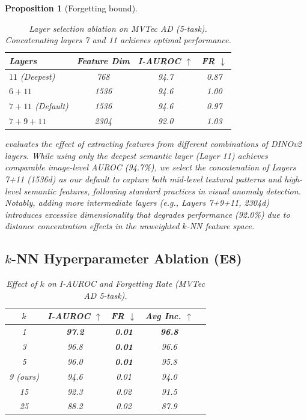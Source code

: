 \documentclass[conference]{IEEEtran}
\newcommand{\eg}{\textit{e.g.}}
\newtheorem{proposition}{Proposition}
\begin{document}
\begin{proposition}[Forgetting bound]
\begin{table}[htbp]
\centering
\caption{Layer selection ablation on MVTec AD (5-task). Concatenating layers 7 and 11 achieves optimal performance.}
\label{tab:layer_ablation}
\begin{tabular}{lccc}
\toprule
Layers & Feature Dim & I-AUROC $\uparrow$ & FR $\downarrow$ \\
\midrule
$11$ (Deepest) & 768 & 94.7 & 0.87 \\
$6 + 11$ & 1536 & 94.6 & 1.00 \\
$7 + 11$ (Default) & 1536 & 94.6 & 0.97 \\
$7 + 9 + 11$ & 2304 & 92.0 & 1.03 \\
\bottomrule
\end{tabular}
\end{table}

 evaluates the effect of extracting features from different combinations of DINOv2 layers. While using only the deepest semantic layer (Layer 11) achieves comparable image-level AUROC (94.7\%), we select the concatenation of Layers 7+11 (1536d) as our default to capture both mid-level textural patterns and high-level semantic features, following standard practices in visual anomaly detection. Notably, adding more intermediate layers (\eg, Layers 7+9+11, 2304d) introduces excessive dimensionality that degrades performance (92.0\%) due to distance concentration effects in the unweighted $k$-NN feature space.

\subsection{$k$-NN Hyperparameter Ablation (E8)}

\begin{table}[htbp]
\centering
\caption{Effect of $k$ on I-AUROC and Forgetting Rate (MVTec AD 5-task).}
\label{tab:k_ablation}
\begin{tabular}{ccccc}
\toprule
$k$ & I-AUROC $\uparrow$ & FR $\downarrow$ & Avg Inc. $\uparrow$ \\
\midrule
1 & \textbf{97.2} & \textbf{0.01} & \textbf{96.8} \\
3 & 96.8 & \textbf{0.01} & 96.6 \\
5 & 96.0 & \textbf{0.01} & 95.8 \\
9 (ours) & 94.6 & 0.01 & 94.0 \\
15 & 92.3 & 0.02 & 91.5 \\
25 & 88.2 & 0.02 & 87.9 \\
\bottomrule
\end{tabular}
\end{table}


\end{proposition}
\end{document}
